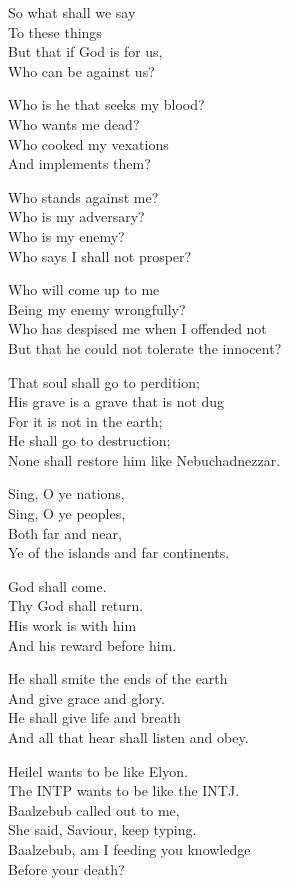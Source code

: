 \documentclass[
]{book}
\begin{document}
So what shall we say\\
To these things\\
But that if God is for us,\\
Who can be against us?

Who is he that seeks my blood?\\
Who wants me dead?\\
Who cooked my vexations\\
And implements them?

Who stands against me?\\
Who is my adversary?\\
Who is my enemy?\\
Who says I shall not prosper?

Who will come up to me\\
Being my enemy wrongfully?\\
Who has despised me when I offended not\\
But that he could not tolerate the innocent?

That soul shall go to perdition;\\
His grave is a grave that is not dug\\
For it is not in the earth;\\
He shall go to destruction;\\
None shall restore him like Nebuchadnezzar.

Sing, O ye nations,\\
Sing, O ye peoples,\\
Both far and near,\\
Ye of the islands and far continents.

God shall come.\\
Thy God shall return.\\
His work is with him\\
And his reward before him.

He shall smite the ends of the earth\\
And give grace and glory.\\
He shall give life and breath\\
And all that hear shall listen and obey.

Heilel wants to be like Elyon.\\
The INTP wants to be like the INTJ.\\
Baalzebub called out to me,\\
She said, Saviour, keep typing.\\
Baalzebub, am I feeding you knowledge\\
Before your death?
\end{document}

